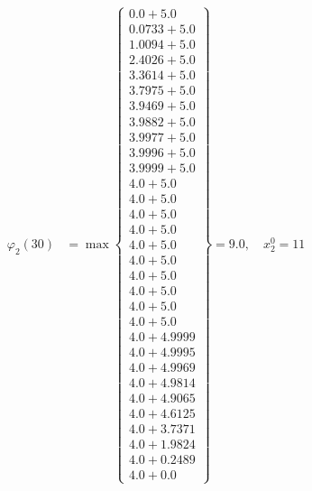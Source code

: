 \documentclass{article}
\begin{document}
\begin{align*}
\varphi_{2}(30) &= \max \left\{ \begin{array}{c}
0.0 + 5.0 \\
 0.0733 + 5.0 \\
 1.0094 + 5.0 \\
 2.4026 + 5.0 \\
 3.3614 + 5.0 \\
 3.7975 + 5.0 \\
 3.9469 + 5.0 \\
 3.9882 + 5.0 \\
 3.9977 + 5.0 \\
 3.9996 + 5.0 \\
 3.9999 + 5.0 \\
 4.0 + 5.0 \\
 4.0 + 5.0 \\
 4.0 + 5.0 \\
 4.0 + 5.0 \\
 4.0 + 5.0 \\
 4.0 + 5.0 \\
 4.0 + 5.0 \\
 4.0 + 5.0 \\
 4.0 + 5.0 \\
 4.0 + 5.0 \\
 4.0 + 4.9999 \\
 4.0 + 4.9995 \\
 4.0 + 4.9969 \\
 4.0 + 4.9814 \\
 4.0 + 4.9065 \\
 4.0 + 4.6125 \\
 4.0 + 3.7371 \\
 4.0 + 1.9824 \\
 4.0 + 0.2489 \\
 4.0 + 0.0
\end{array} \right\}=9.0, \quad x_{2}^0=11\\
  

\end{align*}
\end{document}
